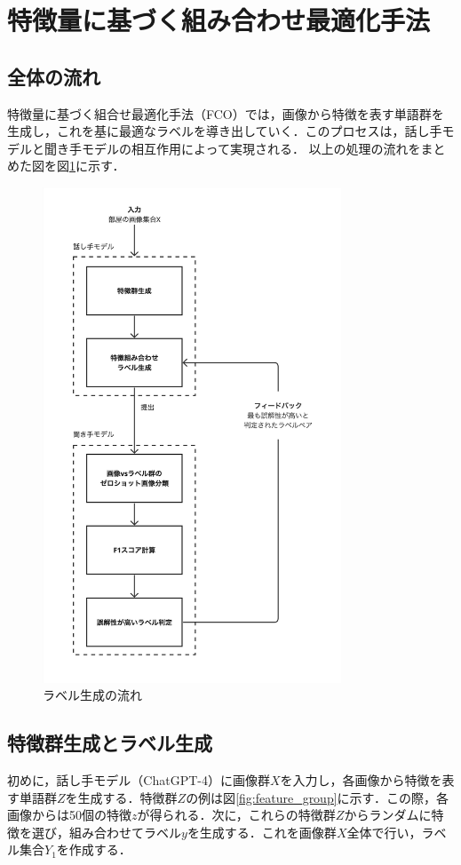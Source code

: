 \documentclass[a4paper,11pt]{jreport}
\begin{document}

\section{特徴量に基づく組み合わせ最適化手法}
\subsection{全体の流れ}
特徴量に基づく組合せ最適化手法（FCO）では，画像から特徴を表す単語群を生成し，これを基に最適なラベルを導き出していく．このプロセスは，話し手モデルと聞き手モデルの相互作用によって実現される．
以上の処理の流れをまとめた図を図\ref{fig:cof_flow_example}に示す．

\begin{figure}[H]
  \centering
  \includegraphics[width=3.5in]{figures/COF_flow.jpg}
  \caption{ラベル生成の流れ}
  \label{fig:cof_flow_example}
\end{figure}

\subsection{特徴群生成とラベル生成}
初めに，話し手モデル（ChatGPT-4）に画像群$X$を入力し，各画像から特徴を表す単語群$Z$を生成する．特徴群$Z$の例は図\ref{fig:feature_group}に示す．この際，各画像からは50個の特徴$z$が得られる．次に，これらの特徴群$Z$からランダムに特徴を選び，組み合わせてラベル$y$を生成する．これを画像群$X$全体で行い，ラベル集合$Y_1$を作成する．
\end{document}
